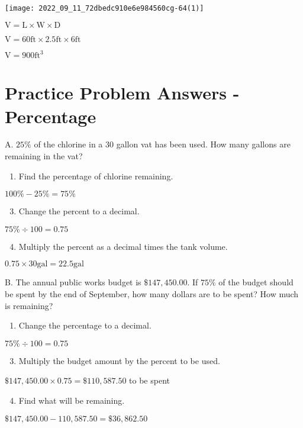 \texttt{[image: 2022\_09\_11\_72dbedc910e6e984560cg-64(1)]}

$\mathrm{V}=\mathrm{L} \times \mathrm{W} \times \mathrm{D}$

$\mathrm{V}=60 \mathrm{ft} \times 2.5 \mathrm{ft} \times 6 \mathrm{ft}$

$\mathrm{V}=900 \mathrm{ft}^{3}$

\section{Practice Problem Answers - Percentage}
A. $25 \%$ of the chlorine in a 30 gallon vat has been used. How many gallons are remaining in the vat?

\begin{enumerate}
  \item Find the percentage of chlorine remaining.
\end{enumerate}
$100 \%-25 \%=75 \%$

\begin{enumerate}
  \setcounter{enumi}{2}
  \item Change the percent to a decimal.
\end{enumerate}
$75 \% \div 100=0.75$

\begin{enumerate}
  \setcounter{enumi}{3}
  \item Multiply the percent as a decimal times the tank volume.
\end{enumerate}
$0.75 \times 30 \mathrm{gal}=22.5 \mathrm{gal}$

B. The annual public works budget is $\$ 147,450.00$. If $75 \%$ of the budget should be spent by the end of September, how many dollars are to be spent? How much is remaining?

\begin{enumerate}
  \item Change the percentage to a decimal.
\end{enumerate}
$75 \% \div 100=0.75$

\begin{enumerate}
  \setcounter{enumi}{2}
  \item Multiply the budget amount by the percent to be used.
\end{enumerate}
$\$ 147,450.00 \times 0.75=\$ 110,587.50$ to be spent

\begin{enumerate}
  \setcounter{enumi}{3}
  \item Find what will be remaining.
\end{enumerate}
$\$ 147,450.00-110,587.50=\$ 36,862.50$

